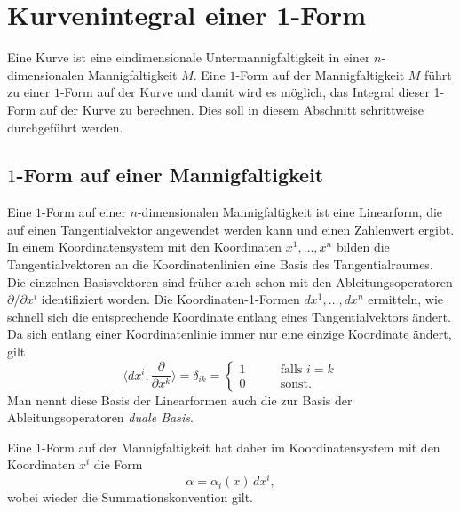 %
%
\section{Kurvenintegral einer 1-Form
\label{buch:kurvenintegral:section:1form}}
%
Eine Kurve ist eine eindimensionale Untermannigfaltigkeit in
einer $n$-dimensionalen Mannigfaltigkeit $M$.
Eine $1$-Form auf der Mannigfaltigkeit $M$ führt zu einer 
$1$-Form auf der Kurve und damit wird es möglich, das Integral
dieser 1-Form auf der Kurve zu berechnen.
Dies soll in diesem Abschnitt schrittweise durchgeführt werden.

%
%
\subsection{$1$-Form auf einer Mannigfaltigkeit}
Eine $1$-Form auf einer $n$-dimensionalen Mannigfaltigkeit ist eine
Linearform, die auf einen Tangentialvektor angewendet werden kann
und einen Zahlenwert ergibt.
In einem Koordinatensystem mit den Koordinaten $x^1,\dots,x^n$ bilden
die Tangentialvektoren an die Koordinatenlinien eine Basis des
Tangentialraumes.
Die einzelnen Basisvektoren sind früher auch schon mit den
Ableitungsoperatoren $\partial/\partial x^i$ identifiziert worden.
Die Koordinaten-1-Formen $dx^1,\dots,dx^n$ ermitteln, wie schnell sich
die entsprechende Koordinate entlang eines Tangentialvektors ändert.
Da sich entlang einer Koordinatenlinie immer nur eine einzige
Koordinate ändert, gilt
\[
\biggl\langle dx^i,\frac{\partial}{\partial x^k}\biggr\rangle
=
\delta_{ik}
=
\begin{cases}
1&\qquad \text{falls $i=k$}\\
0&\qquad \text{sonst}.
\end{cases}
\]
Man nennt diese Basis der Linearformen auch die zur Basis der
Ableitungsoperatoren \emph{duale Basis}.

Eine $1$-Form auf der Mannigfaltigkeit hat daher im Koordinatensystem
mit den Koordinaten $x^i$ die Form
\[
\alpha
=
\alpha_i(x)\, dx^i,
\]
wobei wieder die Summationskonvention gilt.

